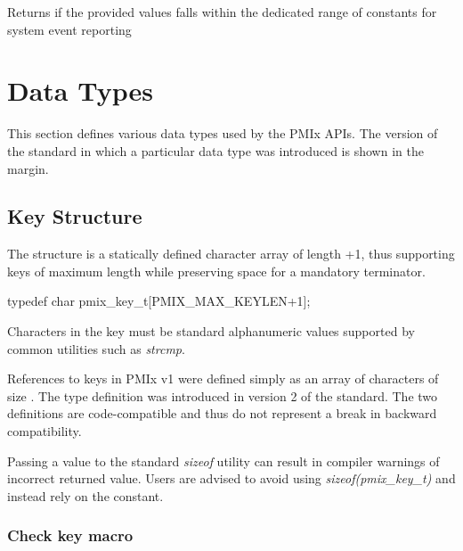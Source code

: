 \begin{arglist}
\end{arglist}

Returns  if the provided values falls within the dedicated range of constants for system event reporting


\section{Data Types}

This section defines various data types used by the PMIx APIs. The version of the standard in which a particular data type was introduced is shown in the margin.

\subsection{Key Structure}

The  structure is a statically defined character array of length +1, thus supporting keys of maximum length  while preserving space for a mandatory  terminator.

\cspecificstart
\begin{codepar}
typedef char pmix_key_t[PMIX_MAX_KEYLEN+1];
\end{codepar}
\cspecificend

Characters in the key must be standard alphanumeric values supported by common utilities such as \textit{strcmp}.

\adviceuserstart
References to keys in \ac{PMIx} v1 were defined simply as an array of characters of size . The  type definition was introduced in version 2 of the standard. The two definitions are code-compatible and thus do not represent a break in backward compatibility.

Passing a  value to the standard \textit{sizeof} utility can result in compiler warnings of incorrect returned value. Users are advised to avoid using \textit{sizeof(pmix_key_t)} and instead rely on the  constant.
\adviceuserend

\subsubsection{Check key macro}

